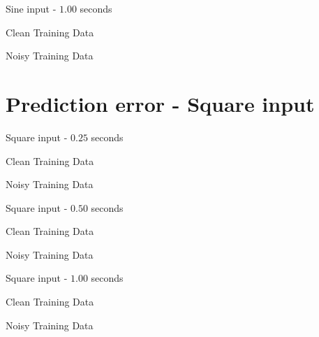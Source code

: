 \documentclass{beamer}
\begin{document}
\begin{frame}{Sine input - $1.00$ seconds}
    \scriptsize
    \begin{table}[!ht]
        \centering
        \caption{Clean Training Data}
    \end{table}

    \begin{table}[!ht]
        \centering
        \caption{Noisy Training Data}
    \end{table}
\end{frame}


\section{Prediction error - Square input}

\begin{frame}{Square input - $0.25$ seconds}
    \scriptsize
    \begin{table}[!ht]
        \centering
        \caption{Clean Training Data}
    \end{table}

    \begin{table}[!ht]
        \centering
        \caption{Noisy Training Data}
    \end{table}
\end{frame}

\begin{frame}{Square input - $0.50$ seconds}
    \scriptsize
    \begin{table}[!ht]
        \centering
        \caption{Clean Training Data}
    \end{table}

    \begin{table}[!ht]
        \centering
        \caption{Noisy Training Data}
    \end{table}
\end{frame}

\begin{frame}{Square input - $1.00$ seconds}
    \scriptsize
    \begin{table}[!ht]
        \centering
        \caption{Clean Training Data}
    \end{table}

    \begin{table}[!ht]
        \centering
        \caption{Noisy Training Data}
    \end{table}
\end{frame}
\end{document}
